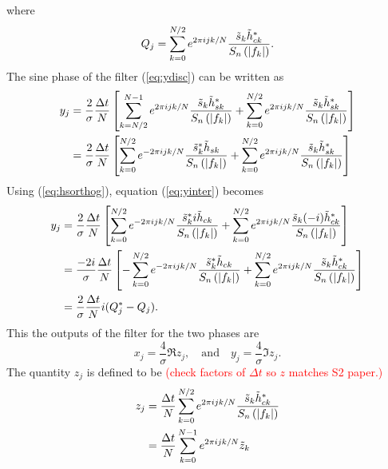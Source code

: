 where
\begin{equation}
\label{eq:Qdef}
Q_j = \sum_{k=0}^{N/2} e^{2\pi ijk/N} 
  \frac{\tilde{s}_k \tilde{h}_{ck}^\ast}{S_n\left(\left|f_{k}\right|\right)}.
\end{equation}
The sine phase of the filter (\ref{eq:ydisc}) can be written as
\begin{equation}
\begin{split}
\label{eq:yinter}
y_j &=
\frac{2}{\sigma}\frac{\Delta t}{N}
\left[
  \sum_{k=N/2}^{N-1} e^{2\pi ijk/N} 
  \frac{\tilde{s}_k \tilde{h}_{sk}^\ast}{S_n\left(\left|f_{k}\right|\right)}
  +
  \sum_{k=0}^{N/2} e^{2\pi ijk/N} 
  \frac{\tilde{s}_k \tilde{h}_{sk}^\ast}{S_n\left(\left|f_{k}\right|\right)}
\right] \\
&= 
\frac{2}{\sigma}\frac{\Delta t}{N}
\left[
  \sum_{k=0}^{N/2} e^{-2\pi ijk/N} 
  \frac{\tilde{s}_k^\ast \tilde{h}_{sk}}{S_n\left(\left|f_{k}\right|\right)}
  +
  \sum_{k=0}^{N/2} e^{2\pi ijk/N} 
  \frac{\tilde{s}_k \tilde{h}_{sk}^\ast}{S_n\left(\left|f_{k}\right|\right)}
\right]
\end{split}
\end{equation}
Using (\ref{eq:hsorthog}), equation (\ref{eq:yinter}) becomes
\begin{equation}
\begin{split}
y_j &= 
\frac{2}{\sigma}\frac{\Delta t}{N}
\left[
  \sum_{k=0}^{N/2} e^{-2\pi ijk/N} 
  \frac{\tilde{s}_k^\ast i\tilde{h}_{ck}}{S_n\left(\left|f_{k}\right|\right)}
  +
  \sum_{k=0}^{N/2} e^{2\pi ijk/N} 
  \frac{\tilde{s}_k (-i)\tilde{h}_{ck}^\ast}{S_n\left(\left|f_{k}\right|\right)}
\right] \\
& = 
\frac{-2i}{\sigma}\frac{\Delta t}{N}
\left[
  - \sum_{k=0}^{N/2} e^{-2\pi ijk/N} 
  \frac{\tilde{s}_k^\ast \tilde{h}_{ck}}{S_n\left(\left|f_{k}\right|\right)}
  +
  \sum_{k=0}^{N/2} e^{2\pi ijk/N} 
  \frac{\tilde{s}_k \tilde{h}_{ck}^\ast}{S_n\left(\left|f_{k}\right|\right)}
\right] \\
& = 
\frac{2}{\sigma}\frac{\Delta t}{N}i(Q_j^\ast - Q_j).
\end{split}
\end{equation}
This the outputs of the filter for the two phases are
\begin{equation}
x_j = \frac{4}{\sigma} \Re z_j,
\quad\mathrm{and}\quad
y_j = \frac{4}{\sigma} \Im z_j.
\end{equation}
The quantity $z_j$ is defined to be \textcolor{red}{(check factors 
of $\Delta t$ so $z$ matches S2 paper.)}
\begin{equation}
\begin{split}
\label{eq:zdef}
z_j &= \frac{\Delta t}{N}\sum_{k=0}^{N/2} e^{2\pi ijk/N} 
\frac{\tilde{s}_k \tilde{h}_{ck}^\ast}{S_n\left(\left|f_{k}\right|\right)}  \\
&= \frac{\Delta t}{N}\sum_{k=0}^{N-1} e^{2\pi ijk/N} \tilde{z}_k
\end{split}
\end{equation}
